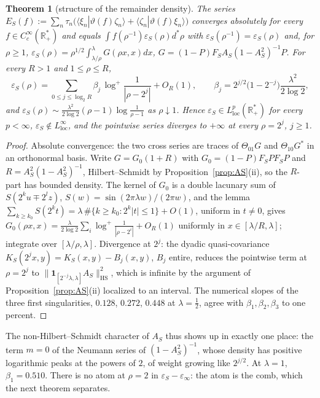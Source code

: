 \documentclass[11pt]{amsart}
\newtheorem{theorem}{Theorem}[section]
\theoremstyle{definition}
\theoremstyle{remark}
\newcommand{\R}{\mathbb R}
\begin{document}
\begin{theorem}[structure of the remainder density]\label{thm:L2}
The series $E_S(f):=\sum_n\tau_n\big(\langle\xi_n|\vartheta(f)\zeta_n\rangle+\langle\zeta_n|\vartheta(f)\xi_n\rangle\big)$ converges
absolutely for every $f\in C_c^\infty(\R_+^*)$ and equals $\int f(\rho^{-1})\varepsilon_S(\rho)d^*\rho$ with
$\varepsilon_S(\rho^{-1})=\varepsilon_S(\rho)$ and, for $\rho\ge1$,
$\varepsilon_S(\rho)=\rho^{1/2}\int_{\lambda/\rho}^\lambda G(\rho x,x)dx$, $G=(1-P)F_SA_S(1-A_S^2)^{-1}P$. For every $R>1$ and
$1\le\rho\le R$,
\[
\varepsilon_S(\rho)=\sum_{0\le j\le\log_2R}\beta_j\,\log^+\frac1{|\rho-2^j|}+O_R(1),\qquad
\beta_j=2^{j/2}\big(1-2^{-j}\big)\frac{\lambda^2}{2\log2},
\]
and $\varepsilon_S(\rho)\sim\frac{\lambda^2}{2\log2}(\rho-1)\log\frac1{\rho-1}$ as $\rho\downarrow1$. Hence
$\varepsilon_S\in L^p_{\mathrm{loc}}(\R_+^*)$ for every $p<\infty$, $\varepsilon_S\notin L^\infty_{\mathrm{loc}}$, and the pointwise
series diverges to $+\infty$ at every $\rho=2^j$, $j\ge1$.
\end{theorem}
\begin{proof}
Absolute convergence: the two cross series are traces of $\Theta_{01}G$ and $\Theta_{10}G^*$ in an orthonormal basis.
Write $G=G_0(1+R)$ with $G_0=(1-P)F_SPF_SP$ and $R=A_S^2(1-A_S^2)^{-1}$, Hilbert--Schmidt by Proposition~\ref{prop:AS}(ii), so
the $R$-part has bounded density. The kernel of $G_0$ is a double lacunary sum of $S(2^ku\mp2^lz)$,
$S(w)=\sin(2\pi\lambda w)/(2\pi w)$, and the lemma $\sum_{k\ge k_0}S(2^kt)=\lambda\,\#\{k\ge k_0:2^k|t|\le1\}+O(1)$, uniform in
$t\neq0$, gives $G_0(\rho x,x)=\frac{\lambda}{2\log2}\sum_i\log^+\frac1{|\rho-2^i|}+O_R(1)$ uniformly in $x\in[\lambda/R,\lambda]$;
integrate over $[\lambda/\rho,\lambda]$. Divergence at $2^j$: the dyadic quasi-covariance $K_S(2^jx,y)=K_S(x,y)-B_j(x,y)$, $B_j$
entire, reduces the pointwise term at $\rho=2^j$ to $\|\mathbf 1_{[2^{-j}\lambda,\lambda]}A_S\|_{\mathrm{HS}}^2$, which is infinite
by the argument of Proposition~\ref{prop:AS}(ii) localized to an interval. The numerical slopes of the three first
singularities, $0.128$, $0.272$, $0.448$ at $\lambda=\frac12$, agree with $\beta_1,\beta_2,\beta_3$ to one percent.
\end{proof}

The non-Hilbert--Schmidt character of $A_S$ thus shows up in exactly one place: the term $m=0$ of the Neumann series of
$(1-A_S^2)^{-1}$, whose density has positive logarithmic peaks at the powers of $2$, of weight growing like $2^{j/2}$. At
$\lambda=1$, $\beta_1=0.510$. There is no atom at $\rho=2$ in $\varepsilon_S-\varepsilon_\infty$: the atom is the comb, which
the next theorem separates.
\end{document}
